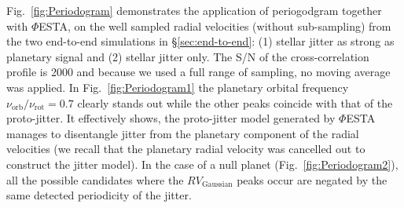 Fig.~\ref{fig:Periodogram} demonstrates the application of periogodgram together with $\mathit{\Phi}$ESTA, on the well sampled radial velocities (without sub-sampling) from the two end-to-end simulations in \S\ref{sec:end-to-end}: (1) stellar jitter as strong as planetary signal and (2) stellar jitter only. The S/N of the cross-correlation profile is 2000 and because we used a full range of sampling, no moving average was applied. In Fig.~\ref{fig:Periodogram1} the planetary orbital frequency $\nu_\text{orb}/\nu_\text{rot} = 0.7$ clearly stands out while the other peaks coincide with that of the proto-jitter. It effectively shows, the proto-jitter model generated by $\mathit{\Phi}$ESTA manages to disentangle jitter from the planetary component of the radial velocities (we recall that the planetary radial velocity was cancelled out to construct the jitter model). In the case of a null planet (Fig.~\ref{fig:Periodogram2}), all the possible candidates where the $RV_\text{Gaussian}$ peaks occur are negated by the same detected periodicity of the jitter. 

